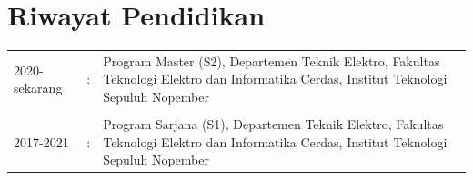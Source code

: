 \section*{Riwayat Pendidikan}
\begin{tabular}{p{3cm}cp{9cm}}
	2020-sekarang  & :&
		Program Master (S2), Departemen Teknik  Elektro, Fakultas Teknologi Elektro dan Informatika Cerdas, Institut Teknologi  Sepuluh Nopember\\
	&&\\
	2017-2021  & :&
		Program Sarjana (S1), Departemen Teknik  Elektro, Fakultas Teknologi Elektro dan Informatika Cerdas, Institut Teknologi  Sepuluh Nopember\\
\end{tabular}



	
	

